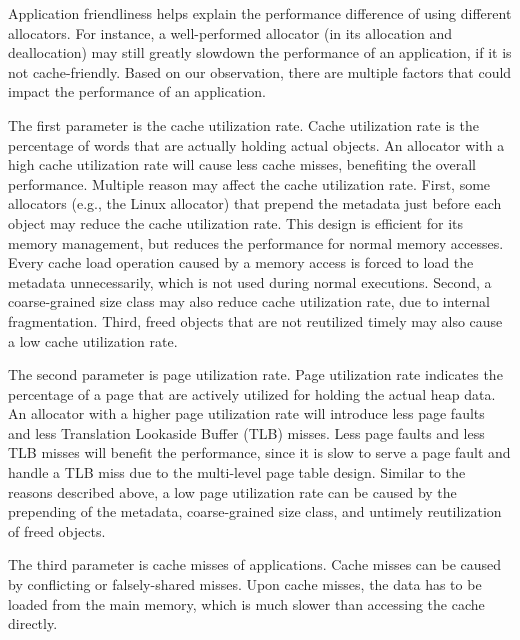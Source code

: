 Application friendliness helps explain the performance difference of using different allocators. For instance, a well-performed allocator (in its allocation and deallocation) may still greatly slowdown the performance of an application, if it is not cache-friendly. Based on our observation, there are multiple factors that could impact the performance of an application.

The first parameter is the cache utilization rate. Cache utilization rate is the percentage of words that are actually holding actual objects. An allocator with a high cache utilization rate will cause less cache misses, benefiting the overall performance. Multiple reason may affect the cache utilization rate. First, some allocators (e.g., the Linux allocator) that  prepend the metadata just before each object may reduce the cache utilization rate. This design is efficient for its memory management, but reduces the performance for normal memory accesses. Every cache load operation caused by a memory access is forced to load the metadata unnecessarily, which is not used during normal executions. 
 Second, a coarse-grained size class may also reduce cache utilization rate, due to internal fragmentation. Third, freed objects that are not reutilized timely may also cause a low cache utilization rate. 


The second parameter is page utilization rate. Page utilization rate indicates the percentage of a page that are actively utilized for holding the actual heap data. An allocator with a higher page utilization rate will introduce less page faults and less Translation Lookaside Buffer (TLB) misses. Less page faults and less TLB misses will benefit the performance, since it is  slow to serve a page fault and handle a TLB miss due to the multi-level page table design. Similar to the reasons described above, a low page utilization rate can be caused by the prepending of the metadata, coarse-grained size class, and untimely reutilization of freed objects. 

The third parameter is cache misses of applications. Cache misses can be caused by conflicting or falsely-shared misses. Upon cache misses, the data has to be loaded from the main memory, which is much slower than accessing the cache directly. 

